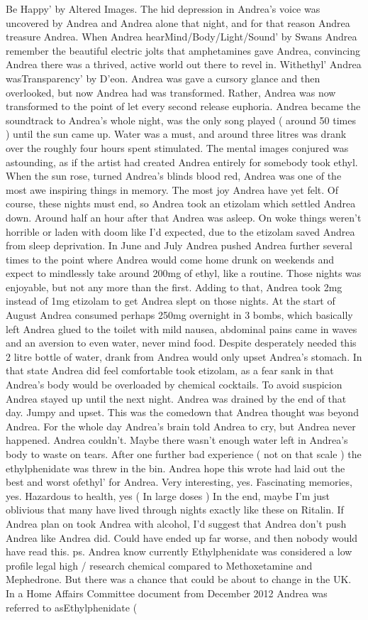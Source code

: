 \documentclass[12pt]{book}
\begin{document}
Be Happy' by Altered Images. The hid depression in Andrea's voice was uncovered by Andrea and Andrea alone that night, and for that reason Andrea treasure Andrea. When Andrea hearMind/Body/Light/Sound' by Swans Andrea remember the beautiful electric jolts that amphetamines gave Andrea, convincing Andrea there was a thrived, active world out there to revel in. Withethyl' Andrea wasTransparency' by D'eon. Andrea was gave a cursory glance and then overlooked, but now Andrea had was transformed. Rather, Andrea was now transformed to the point of let every second release euphoria. Andrea became the soundtrack to Andrea's whole night, was the only song played ( around 50 times ) until the sun came up. Water was a must, and around three litres was drank over the roughly four hours spent stimulated. The mental images conjured was astounding, as if the artist had created Andrea entirely for somebody took ethyl. When the sun rose, turned Andrea's blinds blood red, Andrea was one of the most awe inspiring things in memory. The most joy Andrea have yet felt. Of course, these nights must end, so Andrea took an etizolam which settled Andrea down. Around half an hour after that Andrea was asleep. On woke things weren't horrible or laden with doom like I'd expected, due to the etizolam saved Andrea from sleep deprivation. In June and July Andrea pushed Andrea further several times to the point where Andrea would come home drunk on weekends and expect to mindlessly take around 200mg of ethyl, like a routine. Those nights was enjoyable, but not any more than the first. Adding to that, Andrea took 2mg instead of 1mg etizolam to get Andrea slept on those nights. At the start of August Andrea consumed perhaps 250mg overnight in 3 bombs, which basically left Andrea glued to the toilet with mild nausea, abdominal pains came in waves and an aversion to even water, never mind food. Despite desperately needed this 2 litre bottle of water, drank from Andrea would only upset Andrea's stomach. In that state Andrea did feel comfortable took etizolam, as a fear sank in that Andrea's body would be overloaded by chemical cocktails. To avoid suspicion Andrea stayed up until the next night. Andrea was drained by the end of that day. Jumpy and upset. This was the comedown that Andrea thought was beyond Andrea. For the whole day Andrea's brain told Andrea to cry, but Andrea never happened. Andrea couldn't. Maybe there wasn't enough water left in Andrea's body to waste on tears. After one further bad experience ( not on that scale ) the ethylphenidate was threw in the bin. Andrea hope this wrote had laid out the best and worst ofethyl' for Andrea. Very interesting, yes. Fascinating memories, yes. Hazardous to health, yes ( In large doses ) In the end, maybe I'm just oblivious that many have lived through nights exactly like these on Ritalin. If Andrea plan on took Andrea with alcohol, I'd suggest that Andrea don't push Andrea like Andrea did. Could have ended up far worse, and then nobody would have read this. ps. Andrea know currently Ethylphenidate was considered a low profile legal high / research chemical compared to Methoxetamine and Mephedrone. But there was a chance that could be about to change in the UK. In a Home Affairs Committee document from December 2012 Andrea was referred to asEthylphenidate ( 
\end{document}
